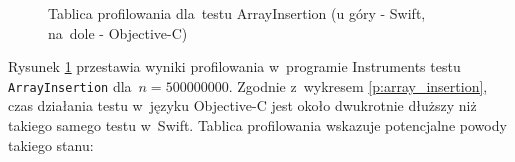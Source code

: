 \documentclass[mgr, shortabstract]{iithesis}
\begin{document}
\begin{figure}
    \caption{Tablica profilowania dla~testu ArrayInsertion (u góry - Swift, na~dole - Objective-C)}
    \label{i:array_insertion}
\end{figure}

Rysunek \ref{i:array_insertion} przestawia wyniki profilowania w~programie Instruments testu \texttt{ArrayInsertion} dla~$n = 500000000$. Zgodnie z~wykresem \ref{p:array_insertion}, czas działania testu w~języku Objective-C jest około dwukrotnie dłuższy niż takiego samego testu w~Swift. Tablica profilowania wskazuje potencjalne powody takiego stanu:
\end{document}
